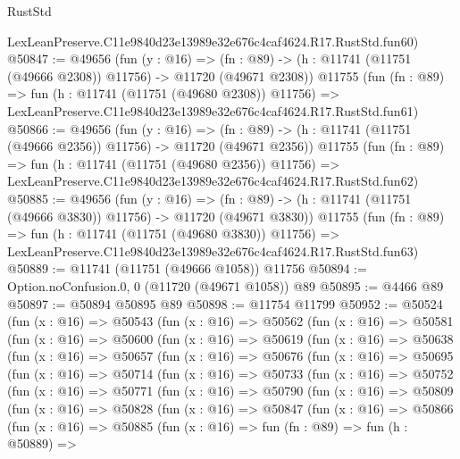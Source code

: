 \begin{lexlean}{RustStd}
\begin{coremodule}
    LexLeanPreserve.C11e9840d23e13989e32e676c4caf4624.R17.RustStd.fun60)
@50847 := @49656
    (fun (y : @16) =>
    (fn : @89) -> (h : @11741 (@11751 (@49666 @2308)) @11756) -> @11720 (@49671 @2308))
    @11755
    (fun (fn : @89) =>
    fun (h : @11741 (@11751 (@49680 @2308)) @11756) =>
    LexLeanPreserve.C11e9840d23e13989e32e676c4caf4624.R17.RustStd.fun61)
@50866 := @49656
    (fun (y : @16) =>
    (fn : @89) -> (h : @11741 (@11751 (@49666 @2356)) @11756) -> @11720 (@49671 @2356))
    @11755
    (fun (fn : @89) =>
    fun (h : @11741 (@11751 (@49680 @2356)) @11756) =>
    LexLeanPreserve.C11e9840d23e13989e32e676c4caf4624.R17.RustStd.fun62)
@50885 := @49656
    (fun (y : @16) =>
    (fn : @89) -> (h : @11741 (@11751 (@49666 @3830)) @11756) -> @11720 (@49671 @3830))
    @11755
    (fun (fn : @89) =>
    fun (h : @11741 (@11751 (@49680 @3830)) @11756) =>
    LexLeanPreserve.C11e9840d23e13989e32e676c4caf4624.R17.RustStd.fun63)
@50889 := @11741 (@11751 (@49666 @1058)) @11756
@50894 := Option.noConfusion.{0, 0} (@11720 (@49671 @1058)) @89
@50895 := @4466 @89
@50897 := @50894 @50895 @89
@50898 := @11754 @11799
@50952 := @50524
    (fun (x : @16) =>
    @50543
      (fun (x : @16) =>
      @50562
        (fun (x : @16) =>
        @50581
          (fun (x : @16) =>
          @50600
            (fun (x : @16) =>
            @50619
              (fun (x : @16) =>
              @50638
                (fun (x : @16) =>
                @50657
                  (fun (x : @16) =>
                  @50676
                    (fun (x : @16) =>
                    @50695
                      (fun (x : @16) =>
                      @50714
                        (fun (x : @16) =>
                        @50733
                          (fun (x : @16) =>
                          @50752
                            (fun (x : @16) =>
                            @50771
                              (fun (x : @16) =>
                              @50790
                                (fun (x : @16) =>
                                @50809
                                  (fun (x : @16) =>
                                  @50828
                                    (fun (x : @16) =>
                                    @50847
                                      (fun (x : @16) =>
                                      @50866
                                        (fun (x : @16) =>
                                        @50885
                                          (fun (x : @16) =>
                                          fun (fn : @89) =>
                                          fun (h : @50889) =>

\end{coremodule}
\end{lexlean}
